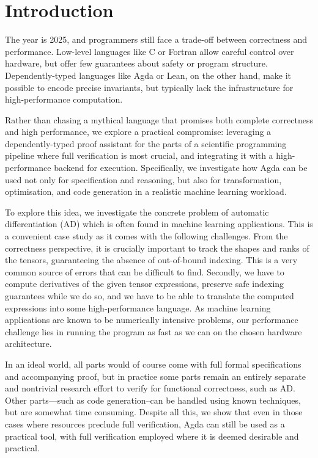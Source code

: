 \section{Introduction\label{sec:intro}}

The year is 2025, and programmers still face a trade-off between correctness and
performance. Low-level languages like C or Fortran allow careful control over
hardware, but offer few guarantees about safety or program structure.
Dependently-typed languages like Agda or Lean, on the other hand, make it
possible to encode precise invariants, but typically lack the infrastructure for
high-performance computation.

Rather than chasing a mythical language that promises both complete correctness
and high performance, we explore a practical compromise: leveraging a
dependently-typed proof assistant for the parts of a scientific programming
pipeline where full verification is most crucial, and integrating it with a
high-performance backend for execution. Specifically, we investigate how Agda
can be used not only for specification and reasoning, but also for
transformation, optimisation, and code generation in a realistic machine
learning workload.

To explore this idea, we investigate the concrete problem of automatic
differentiation (AD) which is often found in machine learning applications. This
is a convenient case study as it comes with the following challenges. From the
correctness perspective, it is crucially important to track the shapes and ranks
of the tensors, guaranteeing the absence of out-of-bound indexing. This is a
very common source of errors that can be difficult to find. Secondly, we have to
compute derivatives of the given tensor expressions, preserve safe indexing
guarantees while we do so, and we have to be able to translate the computed
expressions into some high-performance language. As machine learning
applications are known to be numerically intensive problems, our performance
challenge lies in running the program as fast as we can on the chosen hardware
architecture.

In an ideal world, all parts would of course come with full formal
specifications and accompanying proof, but in practice some parts remain an
entirely separate and nontrivial research effort to verify for functional
correctness, such as AD. Other parts---such as code generation--can be handled
using known techniques, but are somewhat time consuming. Despite all this, we
show that even in those cases where resources preclude full verification, Agda
can still be used as a practical tool, with full verification employed where it
is deemed desirable and practical.

